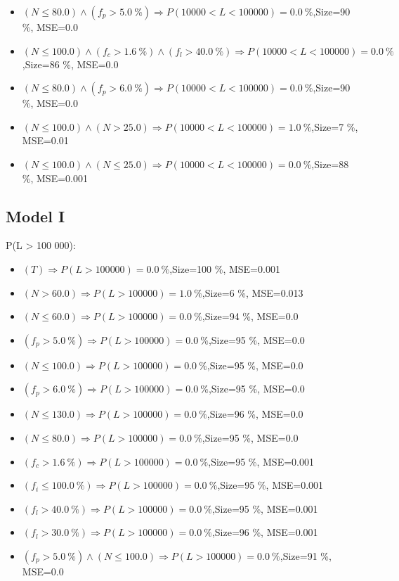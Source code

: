 \documentclass[numbered]{CSL}
\begin{document}
\begin{itemize}
\item $(N \leq 80.0) \land (f_p > 5.0~\%) \Rightarrow P(10 000 < L < 100 000) = 0.0~\%$,\hfill Size=90 \%, MSE=0.0
\item $(N \leq 100.0) \land (f_c > 1.6~\%) \land (f_l > 40.0~\%) \Rightarrow P(10 000 < L < 100 000) = 0.0~\%$,\hfill Size=86 \%, MSE=0.0
\item $(N \leq 80.0) \land (f_p > 6.0~\%) \Rightarrow P(10 000 < L < 100 000) = 0.0~\%$,\hfill Size=90 \%, MSE=0.0
\item $(N \leq 100.0) \land (N > 25.0) \Rightarrow P(10 000 < L < 100 000) = 1.0~\%$,\hfill Size=7 \%, MSE=0.01
\item $(N \leq 100.0) \land (N \leq 25.0) \Rightarrow P(10 000 < L < 100 000) = 0.0~\%$,\hfill Size=88 \%, MSE=0.001
\end{itemize}

\subsection{Model I}
P(L > 100 000):
\begin{itemize}
\item $(T) \Rightarrow P(L > 100 000) = 0.0~\%$,\hfill Size=100 \%, MSE=0.001
\item $(N > 60.0) \Rightarrow P(L > 100 000) = 1.0~\%$,\hfill Size=6 \%, MSE=0.013
\item $(N \leq 60.0) \Rightarrow P(L > 100 000) = 0.0~\%$,\hfill Size=94 \%, MSE=0.0
\item $(f_p > 5.0~\%) \Rightarrow P(L > 100 000) = 0.0~\%$,\hfill Size=95 \%, MSE=0.0
\item $(N \leq 100.0) \Rightarrow P(L > 100 000) = 0.0~\%$,\hfill Size=95 \%, MSE=0.0
\item $(f_p > 6.0~\%) \Rightarrow P(L > 100 000) = 0.0~\%$,\hfill Size=95 \%, MSE=0.0
\item $(N \leq 130.0) \Rightarrow P(L > 100 000) = 0.0~\%$,\hfill Size=96 \%, MSE=0.0
\item $(N \leq 80.0) \Rightarrow P(L > 100 000) = 0.0~\%$,\hfill Size=95 \%, MSE=0.0
\item $(f_c > 1.6~\%) \Rightarrow P(L > 100 000) = 0.0~\%$,\hfill Size=95 \%, MSE=0.001
\item $(f_i \leq 100.0~\%) \Rightarrow P(L > 100 000) = 0.0~\%$,\hfill Size=95 \%, MSE=0.001
\item $(f_l > 40.0~\%) \Rightarrow P(L > 100 000) = 0.0~\%$,\hfill Size=95 \%, MSE=0.001
\item $(f_l > 30.0~\%) \Rightarrow P(L > 100 000) = 0.0~\%$,\hfill Size=96 \%, MSE=0.001
\item $(f_p > 5.0~\%) \land (N \leq 100.0) \Rightarrow P(L > 100 000) = 0.0~\%$,\hfill Size=91 \%, MSE=0.0
\end{itemize}
\end{document}
